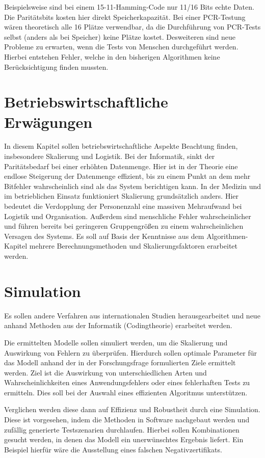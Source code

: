 Beispielsweise sind bei einem 15-11-Hamming-Code nur 11/16 Bits echte Daten.
Die Paritätsbits kosten hier direkt Speicherkapazität.
Bei einer PCR-Testung wären theoretisch alle 16 Plätze verwendbar, da die Durchführung von PCR-Tests selbst (anders als bei Speicher) keine Plätze kostet.
Desweiteren sind neue Probleme zu erwarten, wenn die Tests von Menschen durchgeführt werden.
Hierbei entstehen Fehler, welche in den bisherigen Algorithmen keine Berücksichtigung finden mussten.


\section{Betriebswirtschaftliche Erwägungen}
In diesem Kapitel sollen betriebswirtschaftliche Aspekte Beachtung finden, insbesondere Skalierung und Logistik.
Bei der Informatik, sinkt der Paritätsbedarf bei einer erhöhten Datenmenge.
Hier ist in der Theorie eine endlose Steigerung der Datenmenge effizient, bis zu einem Punkt an dem mehr Bitfehler wahrscheinlich sind als das System berichtigen kann.
In der Medizin und im betrieblichen Einsatz funktioniert Skalierung grundsätzlich anders.
Hier bedeutet die Verdopplung der Personenzahl eine massiven Mehraufwand bei Logistik und Organisation.
Außerdem sind menschliche Fehler wahrscheinlicher und führen bereits bei geringeren Gruppengrößen zu einem wahrscheinlichen Versagen des Systems.
Es soll auf Basis der Kenntnisse aus dem Algorithmen-Kapitel mehrere Berechnungsmethoden und Skalierungsfaktoren erarbeitet werden.

\section{Simulation}
Es sollen andere Verfahren aus internationalen Studien herausgearbeitet und neue anhand Methoden aus der Informatik (Codingtheorie) erarbeitet werden. 

Die ermittelten Modelle sollen simuliert werden, um die Skalierung und Auswirkung von Fehlern zu überprüfen.
Hierdurch sollen optimale Parameter für das Modell anhand der in der Forschungsfrage formulierten Ziele ermittelt werden.
Ziel ist die Auswirkung von unterschiedlichen Arten und Wahrscheinlichkeiten eines Anwendungsfehlers oder eines fehlerhaften Tests zu ermitteln.
Dies soll bei der Auswahl eines effizienten Algoritmus unterstützen.

Verglichen werden diese dann auf Effizienz und Robustheit durch eine Simulation.
Diese ist vorgesehen, indem die Methoden in Software nachgebaut werden und zufällig generierte Testszenarien durchlaufen.
Hierbei sollen Kombinationen gesucht werden, in denen das Modell ein unerwünschtes Ergebnis liefert.
Ein Beispiel hierfür wäre die Ausstellung eines falschen Negativzertifikats.

